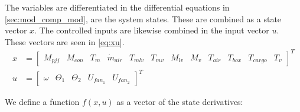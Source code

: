 The variables are differentiated in the differential equations in \cref{sec:mod_comp_mod}, are the system states. These are combined as a state vector $x$. The controlled inputs are likewise combined in the input vector $u$. These vectors are seen in \cref{eq:xu}.
\begin{equation}  \label{eq:xu}
	\begin{split}
		x &= \begin{bmatrix}
			M_{pjj}				&		%
			M_{con} 			&		%
			T_m 				&		%
			\dot{m}_{air}		&		%
			T_{mlv}				&		%
			T_{mv}				&		%
			M_{lv}				&		%
			M_v					&		%
			T_{air}				&		%
			T_{box}				&		%
			T_{cargo}			&		%
			T_v
		\end{bmatrix}^T \\
		u &= \begin{bmatrix}
			\omega				&
			\Theta_1			&			%
			\Theta_2 			&			%
			U_{fan_1}			&			%
			U_{fan_2}						%
		\end{bmatrix}^T
	\end{split}
\end{equation}


We define a function $f(x,u)$ as a vector of the state derivatives:

